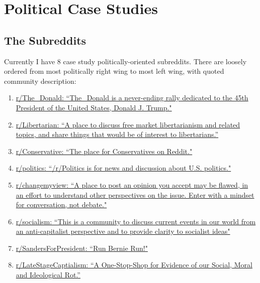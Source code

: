 \section{Political Case Studies} \label{political-subreddits}

\subsection{The Subreddits}
Currently I have 8 case study politically-oriented subreddits. There are loosely ordered from most politically right wing to most left wing, with quoted community description:

\begin{enumerate}
    \item \href{https://www.reddit.com/r/The_Donald}{r/The\_Donald: ``The\_Donald is a never-ending rally dedicated to the 45th President of the United States, Donald J. Trump."}
    
    \item \href{https://www.reddit.com/r/Libertarian}{r/Libertarian: ``A place to discuss free market libertarianism and related topics, and share things that would be of interest to libertarians.''}
    
    \item \href{https://www.reddit.com/r/Conservative}{r/Conservative: ``The place for Conservatives on Reddit." }
    
    \item \href{https://www.reddit.com/r/politics}{r/politics: ``/r/Politics is for news and discussion about U.S. politics."}
    
    \item \href{https://www.reddit.com/r/Conservative}{r/changemyview: ``A place to post an opinion you accept may be flawed, in an effort to understand other perspectives on the issue. Enter with a mindset for conversation, not debate."}
    
    \item \href{https://www.reddit.com/r/socialism}{r/socialism: ``This is a community to discuss current events in our world from an anti-capitalist perspective and to provide clarity to socialist ideas"}
    \item \href{https://www.reddit.com/r/SandersForPresident}{r/SandersForPresident: ``Run Bernie Run!"}
    \item \href{https://www.reddit.com/r/LateStageCapitalism}{r/LateStageCaptialism: ``A One-Stop-Shop for Evidence of our Social, Moral and Ideological Rot.''}
\end{enumerate}


